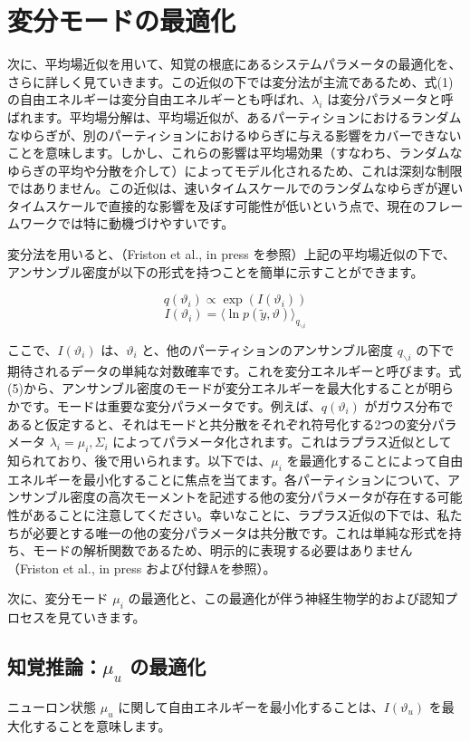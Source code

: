 \documentclass{article}
\begin{document}
\section{変分モードの最適化}
次に、平均場近似を用いて、知覚の根底にあるシステムパラメータの最適化を、さらに詳しく見ていきます。この近似の下では変分法が主流であるため、式(1)の自由エネルギーは変分自由エネルギーとも呼ばれ、$\lambda_i$ は変分パラメータと呼ばれます。平均場分解は、平均場近似が、あるパーティションにおけるランダムなゆらぎが、別のパーティションにおけるゆらぎに与える影響をカバーできないことを意味します。しかし、これらの影響は平均場効果（すなわち、ランダムなゆらぎの平均や分散を介して）によってモデル化されるため、これは深刻な制限ではありません。この近似は、速いタイムスケールでのランダムなゆらぎが遅いタイムスケールで直接的な影響を及ぼす可能性が低いという点で、現在のフレームワークでは特に動機づけやすいです。

変分法を用いると、（Friston et al., in press を参照）上記の平均場近似の下で、アンサンブル密度が以下の形式を持つことを簡単に示すことができます。

$$q(\vartheta_i) \varpropto \exp(I(\vartheta_i))$$
$$I(\vartheta_i)=\langle\ln p(\tilde{y},\vartheta)\rangle_{q_{\backslash i}}$$

ここで、$I(\vartheta_i)$ は、$\vartheta_i$ と、他のパーティションのアンサンブル密度 $q_{\backslash i}$ の下で期待されるデータの単純な対数確率です。これを変分エネルギーと呼びます。式(5)から、アンサンブル密度のモードが変分エネルギーを最大化することが明らかです。モードは重要な変分パラメータです。例えば、$q(\vartheta_i)$ がガウス分布であると仮定すると、それはモードと共分散をそれぞれ符号化する2つの変分パラメータ $\lambda_i=\mu_i,\Sigma_i$ によってパラメータ化されます。これはラプラス近似として知られており、後で用いられます。以下では、$\mu_i$ を最適化することによって自由エネルギーを最小化することに焦点を当てます。各パーティションについて、アンサンブル密度の高次モーメントを記述する他の変分パラメータが存在する可能性があることに注意してください。幸いなことに、ラプラス近似の下では、私たちが必要とする唯一の他の変分パラメータは共分散です。これは単純な形式を持ち、モードの解析関数であるため、明示的に表現する必要はありません（Friston et al., in press および付録Aを参照）。

次に、変分モード $\mu_i$ の最適化と、この最適化が伴う神経生物学的および認知プロセスを見ていきます。

\subsection{知覚推論：$\mu_u$ の最適化}
ニューロン状態 $\mu_u$ に関して自由エネルギーを最小化することは、$I(\vartheta_u)$ を最大化することを意味します。
\end{document}

